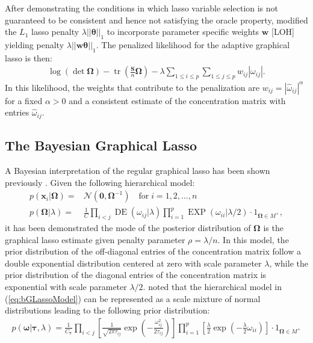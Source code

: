 \documentclass[11pt]{article}
\DeclareMathOperator{\tr}{tr}
\DeclareMathOperator{\DE}{DE}
\DeclareMathOperator{\EXP}{EXP}
\begin{document}
After demonstrating the conditions in which lasso variable selection is not guaranteed to be consistent and hence not satisfying the oracle property, \cite{zou2006} modified the $L_1$ lasso penalty $\lambda ||\boldsymbol{\theta}||_1$ to incorporate parameter specific weights $\textbf{w}$ [LOH] yielding penalty $\lambda ||\textbf{w} \boldsymbol{\theta}||_1$. The penalized likelihood for the adaptive graphical lasso is then:
\begin{align}
	\log(\det \boldsymbol{\Omega})-\tr \left(\frac{\mathbf{S}}{n} \boldsymbol{\Omega}\right) - \lambda \sum_{1\leq i \leq p} \sum_{1 \leq j \leq p} w_{ij} |\omega_{ij}|.
\end{align}
In this likelihood, the weights that contribute to the penalization are $w_{ij}=|\hat{\omega}_{ij}|^\alpha$ for a fixed $\alpha >0$ and a consistent estimate of the concentration matrix with entries $\hat{\omega}_{ij}$.

\subsection{The Bayesian Graphical Lasso}
A Bayesian interpretation of the regular graphical lasso \citep{friedman2007} has been shown previously \citep{wang2012}. Given the following hierarchical model:
\begin{align}
	p(\textbf{x}_i|\boldsymbol{\Omega}) =& \mathcal{N}(\textbf{0},\boldsymbol{\Omega}^{-1}) \quad \text{for} \; i=1,2,\hdots,n\\
	p(\boldsymbol{\Omega}|\lambda) =& \frac{1}{C} \prod_{i<j} \DE(\omega_{ij}|\lambda) \prod_{i=1}^{p} \EXP (\omega_{ii} | \lambda / 2) \cdot 1_{\boldsymbol{\Omega}\in M^+},
	\label{eq:bGLassoModel}
\end{align}
it has been demonstrated the mode of the posterior distribution of $\boldsymbol{\Omega}$ is the graphical lasso estimate given penalty parameter $\rho=\lambda/n$. In this model, the prior distribution of the off-diagonal entries of the concentration matrix follow a double exponential distribution centered at zero with scale parameter $\lambda$, while the prior distribution of the diagonal entries of the concentration matrix is exponential with scale parameter $\lambda/2$.   noted that the hierarchical model in (\ref{eq:bGLassoModel}) can be represented as a scale mixture of normal distributions \cite{andrews1974,west1987} leading to the following prior distribution:
\begin{align}
	p(\boldsymbol{\omega}| \boldsymbol{\tau},\lambda)=\frac{1}{C_{\boldsymbol{\tau}}} \prod_{i<j} \left[ \frac{1}{\sqrt{2\pi \tau_{ij}}} \exp \left(- \frac{\omega_{ij}^2}{2\tau_{ij}}\right) \right] \prod_{i=1}^{p} \left[\frac{\lambda}{2} \exp \left(-\frac{\lambda}{2}\omega_{ii} \right)\right] \cdot 1_{\boldsymbol{\Omega}\in M^+}
\end{align}
\end{document}
